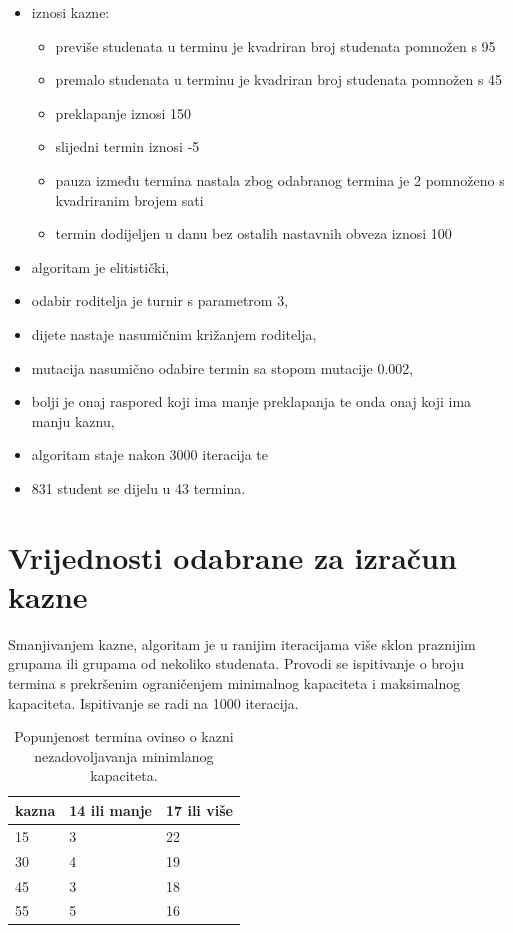 \documentclass[times, utf8, zavrsni]{fer}
\begin{document}
\begin{itemize}
	\item iznosi kazne:
	\begin{itemize}
		\item previše studenata u terminu je kvadriran broj studenata pomnožen s 95
		\item premalo studenata u terminu  je kvadriran broj studenata pomnožen s 45
		\item preklapanje iznosi 150
		\item slijedni termin iznosi -5
		\item pauza između termina nastala zbog odabranog termina je 2 pomnoženo s kvadriranim brojem sati
		\item termin dodijeljen u danu bez ostalih nastavnih obveza iznosi 100
	\end{itemize}	
	\item algoritam je elitistički,
	\item odabir roditelja je turnir s parametrom 3,
	\item dijete nastaje nasumičnim križanjem roditelja, 
	\item mutacija nasumično odabire termin sa stopom mutacije 0.002,
	\item bolji je onaj raspored koji ima manje preklapanja te onda onaj koji ima manju kaznu,
	\item algoritam staje nakon 3000 iteracija te
	\item 831 student se dijelu u 43 termina.
\end{itemize}

\section{Vrijednosti odabrane za izračun kazne}

Smanjivanjem kazne, algoritam je u ranijim iteracijama više sklon praznijim grupama ili grupama od nekoliko studenata. Provodi se ispitivanje o broju termina s prekršenim ograničenjem minimalnog kapaciteta i maksimalnog kapaciteta. Ispitivanje se radi na 1000 iteracija.

\begin{table}[htb]
\caption{Popunjenost termina ovinso o kazni nezadovoljavanja minimlanog kapaciteta.}
\label{tbl:min-popunjenost}
\centering
\begin{tabular}{lll} \hline
kazna & 14 ili manje &  17 ili više \\ \hline
15 & 3 & 22 \\
30 & 4 & 19 \\
45 & 3 & 18 \\
55 & 5 & 16 \\ \hline
\end{tabular}
\end{table}
\end{document}
